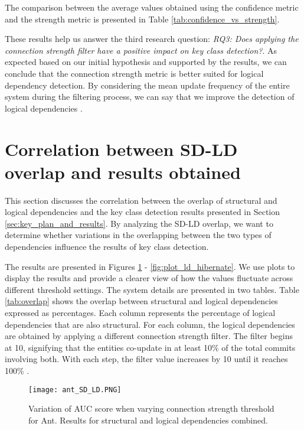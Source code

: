 The comparison between the average values obtained using the confidence metric and the strength metric is presented in Table \ref{tab:confidence_vs_strength}. 

These results help us answer the third research question: \textit{RQ3: Does applying the connection strength filter have a positive impact on key class detection?}. As expected based on our initial hypothesis and supported by the results, we can conclude that the connection strength metric is better suited for logical dependency detection. By considering the mean update frequency of the entire system during the filtering process, we can say that we improve the detection of logical dependencies \cite{b4}.





\section{Correlation between SD-LD overlap and results obtained}
\label{sec:key_overlapping}

\hspace{4em}This section discusses the correlation between the overlap of structural and logical dependencies and the key class detection results presented in Section \ref{sec:key_plan_and_results}. By analyzing the SD-LD overlap, we want to determine whether variations in the overlapping between the two types of dependencies influence the results of key class detection.

The results are presented in Figures \ref{fig:plot_sd_ld_ant} - \ref{fig:plot_ld_hibernate}. We use plots to display the results and provide a clearer view of how the values fluctuate across different threshold settings. The system details are presented in two tables. Table \ref{tab:overlap} shows the overlap between structural and logical dependencies expressed as percentages. Each column represents the percentage of logical dependencies that are also structural. For each column, the logical dependencies are obtained by applying a different connection strength filter. The filter begins at 10, signifying that the entities co-update in at least 10\% of the total commits involving both. With each step, the filter value increases by 10 until it reaches 100\% \cite{b4}.




\begin{figure}
\centering
\texttt{[image: ant\_SD\_LD.PNG]}
\caption{Variation of AUC score when varying connection strength threshold for Ant. Results for structural and logical dependencies combined. }
\label{fig:plot_sd_ld_ant}
\centering
\end{figure}



